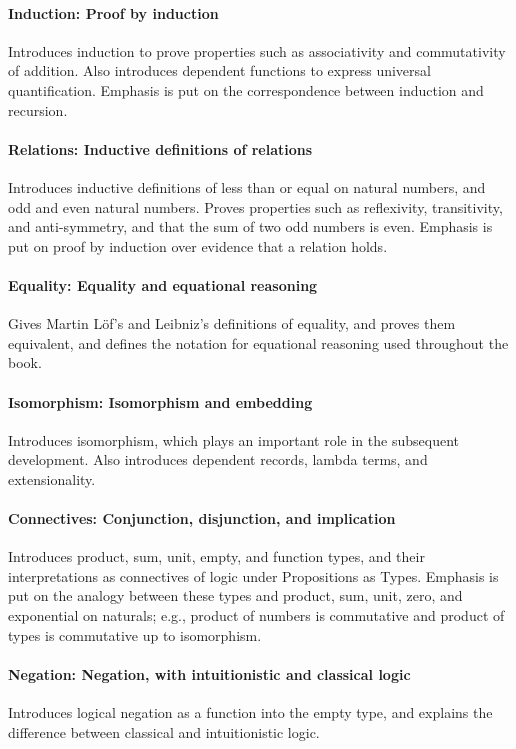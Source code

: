 \documentclass[runningheads]{llncs}
\begin{document}
\paragraph{Induction: Proof by induction}
Introduces induction to prove properties
such as associativity and commutativity of addition.
Also introduces dependent functions to express universal quantification.
Emphasis is put on the correspondence between induction and recursion.

\paragraph{Relations: Inductive definitions of relations}
Introduces inductive definitions of less than or equal on natural numbers,
and odd and even natural numbers.
Proves properties such as reflexivity, transitivity, and
anti-symmetry, and that the sum of two odd numbers is even.
Emphasis is put on proof by induction over evidence that a relation holds.

\paragraph{Equality: Equality and equational reasoning}
Gives Martin L\"of's and Leibniz's definitions of equality, and proves
them equivalent, and defines the notation for equational reasoning used
throughout the book.

\paragraph{Isomorphism: Isomorphism and embedding}
Introduces isomorphism, which plays an important role in the
subsequent development.  Also introduces dependent records, lambda
terms, and extensionality.

\paragraph{Connectives: Conjunction, disjunction, and implication}
Introduces product, sum, unit, empty, and function types, and their
interpretations as connectives of logic under Propositions as Types.
Emphasis is put on the analogy between these types and product, sum,
unit, zero, and exponential on naturals; e.g., product of numbers is
commutative and product of types is commutative up to isomorphism.

\paragraph{Negation: Negation, with intuitionistic and classical logic}
Introduces logical negation as a function into the empty
type, and explains the difference between classical and intuitionistic
logic.
\end{document}
